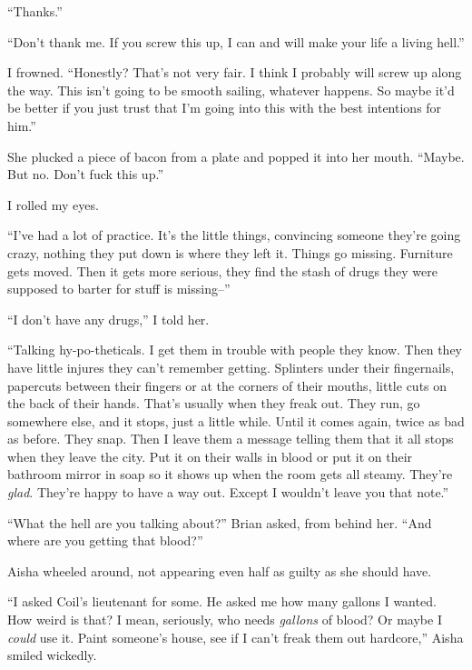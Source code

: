 ``Thanks.''



``Don't thank me.  If you screw this up, I can and will make your life a living hell.''



I frowned.  ``Honestly?  That's not very fair.  I think I probably will screw up along the way.  This isn't going to be smooth sailing, whatever happens.  So maybe it'd be better if you just trust that I'm going into this with the best intentions for him.''



She plucked a piece of bacon from a plate and popped it into her mouth.  ``Maybe.  But no. Don't fuck this up.''



I rolled my eyes.



``I've had a lot of practice.  It's the little things, convincing someone they're going crazy, nothing they put down is where they left it.  Things go missing.  Furniture gets moved.  Then it gets more serious, they find the stash of drugs they were supposed to barter for stuff is missing--''



``I don't have any drugs,'' I told her.



``Talking hy-po-theticals.  I get them in trouble with people they know.  Then they have little injures they can't remember getting.  Splinters under their fingernails, papercuts between their fingers or at the corners of their mouths, little cuts on the back of their hands.  That's usually when they freak out.  They run, go somewhere else, and it stops, just a little while.  Until it comes again, twice as bad as before.  They snap.  Then I leave them a message telling them that it all stops when they leave the city.  Put it on their walls in blood or put it on their bathroom mirror in soap so it shows up when the room gets all steamy.  They're \emph{glad}.  They're happy to have a way out.  Except I wouldn't leave you that note.''



``What the hell are you talking about?'' Brian asked, from behind her.  ``And where are you getting that blood?''



Aisha wheeled around, not appearing even half as guilty as she should have.



``I asked Coil's lieutenant for some.  He asked me how many gallons I wanted.  How weird is that?  I mean, seriously, who needs \emph{gallons} of blood?  Or maybe I \emph{could} use it.  Paint someone's house, see if I can't freak them out hardcore,'' Aisha smiled wickedly.




